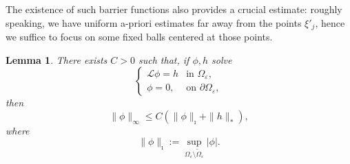 \documentclass[11pt]{article}
\newtheorem{lemma}{Lemma}[section]
\begin{document}
The existence of such barrier functions also provides a crucial estimate: roughly speaking, we have uniform a-priori estimates far away from the points $\xi'_j$, hence we suffice to focus on some fixed balls centered at those points.

\begin{lemma}\label{innernorm}
There exists $C>0$ such that, if $\phi,h$ solve
$$\left\{\begin{array}{ll}
\nonumber\mathcal L\phi=h&\text{in }\Omega_\varepsilon,\\
\phi=0,&\text{on }\partial\Omega_\varepsilon,
\end{array}\right.$$
then
$$\|\phi\|_\infty\le C(\|\phi\|_\imath+\|h\|_\ast),$$
where
$$\|\phi\|_\imath:=\sup_{\Omega_\varepsilon\setminus\widetilde\Omega_\varepsilon}|\phi|.$$
\end{lemma}
\end{document}
